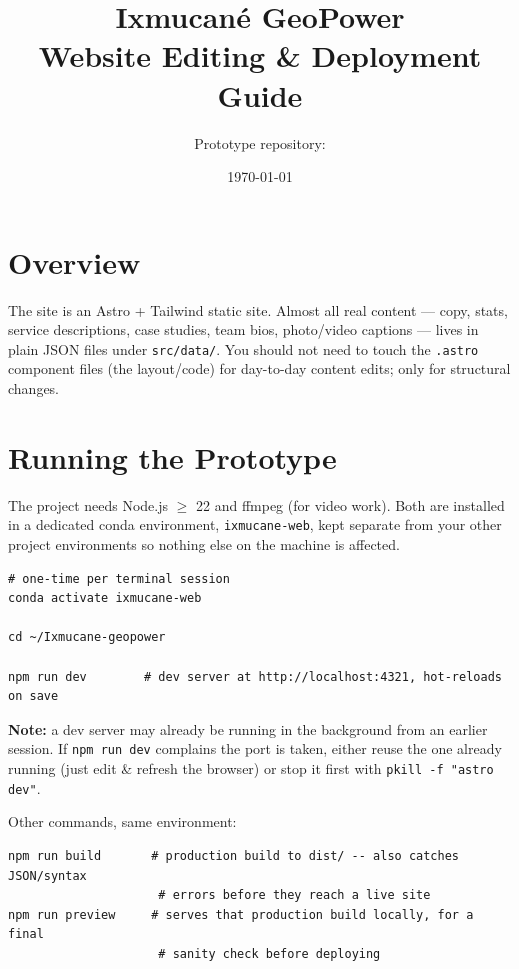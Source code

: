 \documentclass[11pt]{article}
\title{\vspace{-1.5cm}\textbf{\color{ixaccent}Ixmucan\'e GeoPower}\\[4pt]\Large Website Editing \& Deployment Guide}
\author{Prototype repository: \file{github.com/julimo80/Ixmucane-geopower}}
\date{\today}
\newcommand{\code}[1]{\texttt{\small #1}}
\newcommand{\file}[1]{\texttt{\small\color{ixaccent}#1}}
\begin{document}
\maketitle
\vspace{-1.2cm}

\section*{Overview}
The site is an Astro + Tailwind static site. Almost all real content --- copy,
stats, service descriptions, case studies, team bios, photo/video captions ---
lives in plain JSON files under \file{src/data/}. You should not need to
touch the \file{.astro} component files (the layout/code) for day-to-day
content edits; only for structural changes.

\section{Running the Prototype}

The project needs Node.js $\geq$ 22 and ffmpeg (for video work). Both are
installed in a dedicated conda environment, \code{ixmucane-web}, kept separate
from your other project environments so nothing else on the machine is
affected.

\begin{codebox}
\begin{Verbatim}
# one-time per terminal session
conda activate ixmucane-web

cd ~/Ixmucane-geopower

npm run dev        # dev server at http://localhost:4321, hot-reloads on save
\end{Verbatim}
\end{codebox}

\begin{notebox}
\textbf{Note:} a dev server may already be running in the background from an
earlier session. If \code{npm run dev} complains the port is taken, either
reuse the one already running (just edit \& refresh the browser) or stop it
first with \code{pkill -f "astro dev"}.
\end{notebox}

Other commands, same environment:

\begin{codebox}
\begin{Verbatim}
npm run build       # production build to dist/ -- also catches JSON/syntax
                     # errors before they reach a live site
npm run preview     # serves that production build locally, for a final
                     # sanity check before deploying
\end{Verbatim}
\end{codebox}
\end{document}
